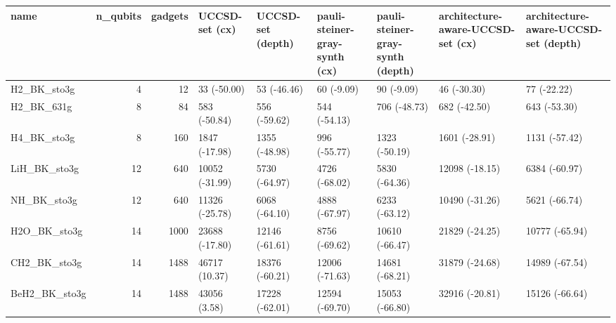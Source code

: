 \begin{tabular}{lrrllllll}
\toprule
name & n\_qubits & gadgets & UCCSD-set (cx) & UCCSD-set (depth) & pauli-steiner-gray-synth (cx) & pauli-steiner-gray-synth (depth) & architecture-aware-UCCSD-set (cx) & architecture-aware-UCCSD-set (depth) \\
\midrule
H2\_BK\_sto3g & 4 & 12 & 33 (-50.00) & 53 (-46.46) & 60 (-9.09) & 90 (-9.09) & 46 (-30.30) & 77 (-22.22) \\
H2\_BK\_631g & 8 & 84 & 583 (-50.84) & 556 (-59.62) & 544 (-54.13) & 706 (-48.73) & 682 (-42.50) & 643 (-53.30) \\
H4\_BK\_sto3g & 8 & 160 & 1847 (-17.98) & 1355 (-48.98) & 996 (-55.77) & 1323 (-50.19) & 1601 (-28.91) & 1131 (-57.42) \\
LiH\_BK\_sto3g & 12 & 640 & 10052 (-31.99) & 5730 (-64.97) & 4726 (-68.02) & 5830 (-64.36) & 12098 (-18.15) & 6384 (-60.97) \\
NH\_BK\_sto3g & 12 & 640 & 11326 (-25.78) & 6068 (-64.10) & 4888 (-67.97) & 6233 (-63.12) & 10490 (-31.26) & 5621 (-66.74) \\
H2O\_BK\_sto3g & 14 & 1000 & 23688 (-17.80) & 12146 (-61.61) & 8756 (-69.62) & 10610 (-66.47) & 21829 (-24.25) & 10777 (-65.94) \\
CH2\_BK\_sto3g & 14 & 1488 & 46717 (10.37) & 18376 (-60.21) & 12006 (-71.63) & 14681 (-68.21) & 31879 (-24.68) & 14989 (-67.54) \\
BeH2\_BK\_sto3g & 14 & 1488 & 43056 (3.58) & 17228 (-62.01) & 12594 (-69.70) & 15053 (-66.80) & 32916 (-20.81) & 15126 (-66.64) \\
\bottomrule
\end{tabular}
